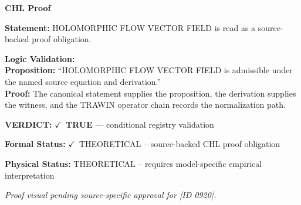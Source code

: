 \vspace{0.45em}
\noindent\textbf{CHL Proof}\par
\textbf{Statement:} HOLOMORPHIC FLOW VECTOR FIELD is read as a source-backed proof obligation.

\textbf{Logic Validation:}\\
\textbf{Proposition:} ``HOLOMORPHIC FLOW VECTOR FIELD is admissible under the named source equation and derivation.''\\
\textbf{Proof:} The canonical statement supplies the proposition, the derivation supplies the witness, and the TRAWIN operator chain records the normalization path.

\textbf{VERDICT:} \ensuremath{\checkmark}\ \textbf{TRUE} --- conditional registry validation

\textbf{Formal Status:} \ensuremath{\checkmark}\ THEORETICAL -- source-backed CHL proof obligation

\textbf{Physical Status:} THEORETICAL -- requires model-specific empirical interpretation
\par\vspace{0.45em}
\par
\vfill
\begingroup\footnotesize\itshape
Proof visual pending source-specific approval for [ID 0920].
\par\endgroup
\vfill
\endgroup
\endgroup
